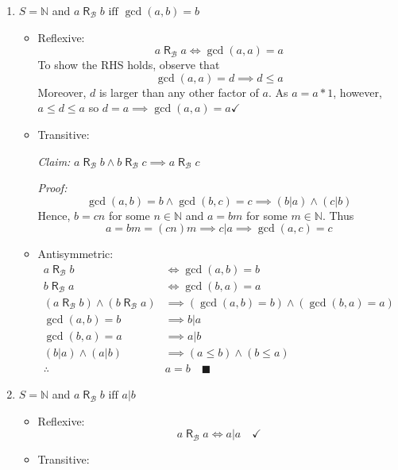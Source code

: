 \documentclass[12pt]{article}
\newcommand{\qed}{\quad \blacksquare}
\newcommand{\N}{\mathbb{N}}
\newcommand{\rb}{\; \mathsf{R}_\mathcal{B}\;}
\begin{document}
\begin{enumerate}[label=(\alph*)]
    \item $S =\mathbb{N}$ and $a\; \mathsf{R}_\mathcal{B} \; b \text{ iff } \gcd(a, b) = b$ 
        
    \color{blue}
        \begin{itemize}
            \item Reflexive: 
            \[a \rb a \iff \gcd(a, a) = a\]
            To show the RHS holds, observe that \[\gcd(a, a) = d \implies d \leq a\] 
            Moreover, $d$ is larger than any other factor of $a$. As $a = a * 1$, however, $a \leq d \leq a$ so $d = a \implies \gcd(a, a) = a \checkmark$

            \item Transitive: 
            
            \emph{Claim:} $a \rb b \land b \rb c \implies a \rb c$

            \emph{Proof:} 
            \[\gcd(a, b) = b \land \gcd(b, c) = c \implies (b | a) \land (c | b)\]
            Hence, $b = cn$ for some $n \in \N$ and $a = bm$ for some $m \in \N$. Thus 
            \[a = bm = (cn)m \implies c | a \implies \gcd(a, c) = c\]

            \item Antisymmetric: 
            \begin{align*}
                a \rb b &\iff \gcd(a, b) = b\\
                b \rb a &\iff \gcd(b, a) = a\\
                (a \rb b) \land (b \rb a) &\implies (\gcd(a, b) = b) \land (\gcd(b,a)= a)\\
                \gcd(a, b) = b &\implies b | a\\
                \gcd(b, a) = a &\implies a | b\\
                (b | a) \land (a | b) &\implies (a \leq b) \land (b \leq a)\\
                \therefore \quad &a = b \qed
            \end{align*}
        \end{itemize}
    \color{black}

    \item $S =\mathbb{N}$ and $a\; \mathsf{R}_\mathcal{B} \; b \text{ iff } a | b$ 
    
    \color{blue}
    \begin{itemize}
        \item Reflexive: 
        \[a \rb a \iff a | a \quad \checkmark\]

        \item Transitive: 
        

\end{itemize}
\end{enumerate}
\end{document}
